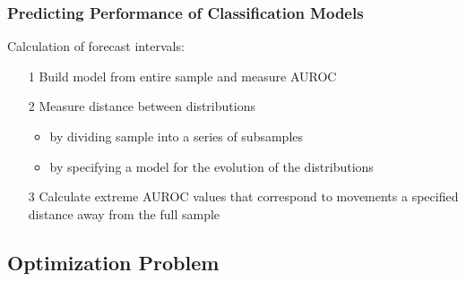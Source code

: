 \documentclass{beamer}
\begin{document}
\begin{frame}
\frametitle{Predicting Performance of Classification Models}

Calculation of forecast intervals:
    \begin{itemize}
        \item[1] Build model from entire sample and measure AUROC
        \item[2] Measure distance between distributions
            \begin{itemize}
                \item by dividing sample into a series of subsamples
                \item by specifying a model for the evolution of the distributions
            \end{itemize}
        \item[3] Calculate extreme AUROC values that correspond to movements a specified distance away from the full sample
    \end{itemize}

\end{frame}




\subsection{Optimization Problem}


\end{document}
